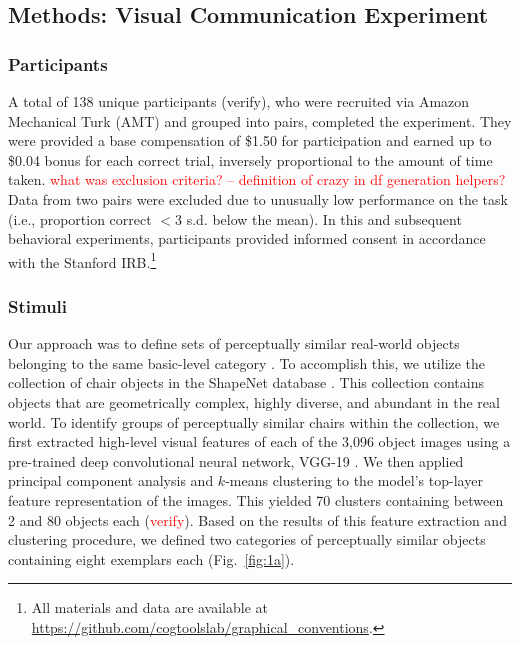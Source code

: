 \documentclass[10pt,letterpaper]{article}
\newcommand{\red}[1]{\textcolor{Red}{#1}}
\begin{document}
\subsection{Methods: Visual Communication Experiment}

\subsubsection{Participants} A total of 138 unique participants (verify), who were recruited via Amazon Mechanical Turk (AMT) and grouped into pairs, completed the experiment.
They were provided a base compensation of \$1.50 for participation and earned up to \$0.04 bonus for each correct trial, inversely proportional to the amount of time taken. 
\red{what was exclusion criteria? -- definition of crazy in df generation helpers?}
Data from two pairs were excluded due to unusually low performance on the task (i.e., proportion correct $<$3 s.d. below the mean).
In this and subsequent behavioral experiments, participants provided informed consent in accordance with the Stanford IRB.\footnote{All materials and data are available at \url{https://github.com/cogtoolslab/graphical_conventions}.}

\subsubsection{Stimuli} 

Our approach was to define sets of perceptually similar real-world objects belonging to the same basic-level category \cite{MervisRosch81_CategorizationReview}.
To accomplish this, we utilize the collection of chair objects in the ShapeNet database \cite{chang2015shapenet}.
This collection contains objects that are geometrically complex, highly diverse, and abundant in the real world.
To identify groups of perceptually similar chairs within the collection, we first extracted high-level visual features of each of the 3,096 object images using a pre-trained deep convolutional neural network, VGG-19 \cite{simonyan2014very}. 
We then applied principal component analysis and $k$-means clustering to the model's top-layer feature representation of the images. 
This yielded 70 clusters containing between 2 and 80 objects each (\red{verify}).
Based on the results of this feature extraction and clustering procedure, we defined two categories of perceptually similar objects containing eight exemplars each (Fig.~\ref{fig:1a}). 
\end{document}
